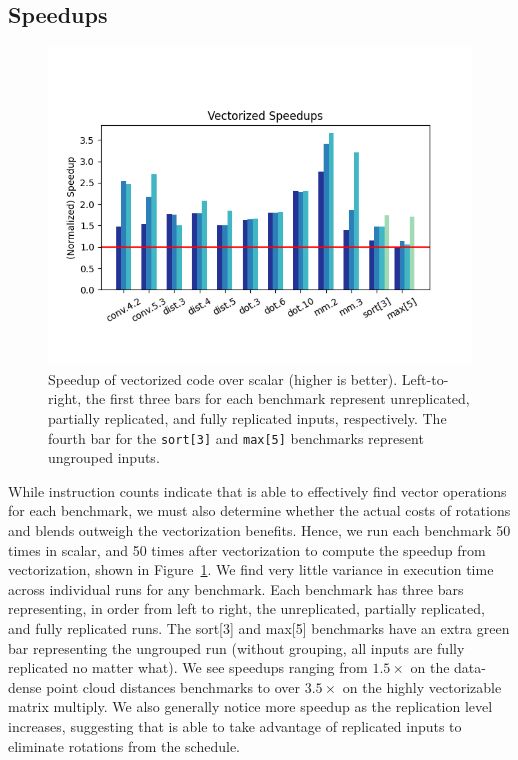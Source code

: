 \subsection{Speedups}\label{sec:speedups}

\begin{figure}[t]
	\centering
    \includegraphics[width=0.9\linewidth]{figures/graphs/vector_speedups.png}
    \vspace{-3em}
    \caption{Speedup of vectorized code over scalar (higher is better). Left-to-right, the first three bars for each benchmark represent unreplicated, partially replicated, and fully replicated inputs, respectively. The fourth bar for the {\tt sort[3]} and {\tt max[5]} benchmarks represent ungrouped inputs.}\label{fig:vector-speedups}
\end{figure}

While instruction counts indicate that \system is able to effectively find vector operations for each benchmark, we must also determine whether the actual costs of rotations and blends outweigh the vectorization benefits. Hence, we run each benchmark 50 times in scalar, and 50 times after vectorization to compute the speedup from vectorization, shown in Figure~\ref{fig:vector-speedups}.
We find very little variance in execution time across individual runs for any benchmark.
Each benchmark has three bars representing, in order from left to right, the unreplicated, partially replicated, and fully replicated runs. 
The \textsf{sort[3]} and \textsf{max[5]} benchmarks have an extra green bar representing the ungrouped run (without grouping, all inputs are fully replicated no matter what).
We see speedups ranging from $1.5\times$ on the data-dense point cloud distances benchmarks to over $3.5\times$ on the highly vectorizable matrix multiply.
We also generally notice more speedup as the replication level increases, suggesting that \system is able to take advantage of replicated inputs to eliminate rotations from the schedule.

